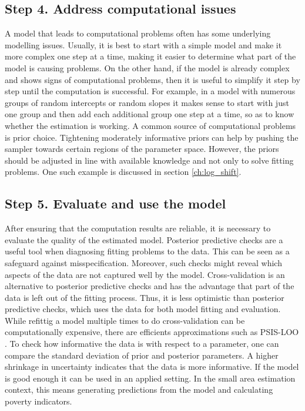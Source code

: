 
\subsection{Step 4. Address computational issues}

A model that leads to computational problems often has some underlying modelling issues.
Usually, it is best to start with a simple model and make it more complex one step at a time, making it easier to determine what part of the model is causing problems.
On the other hand, if the model is already complex and shows signs of computational problems, then it is useful to simplify it step by step until the computation is successful.
For example, in a model with numerous groups of random intercepts or random slopes it makes sense to start with just one group and then add each additional group one step at a time, so as to know whether the estimation is working.
A common source of computational problems is prior choice.
Tightening moderately informative priors can help by pushing the sampler towards certain regions of the parameter space.
However, the priors should be adjusted in line with available knowledge and not only to solve fitting problems.
One such example is discussed in section \ref{ch:log_shift}.

\subsection{Step 5. Evaluate and use the model}

After ensuring that the computation results are reliable, it is necessary to evaluate the quality of the estimated model.
Posterior predictive checks are a useful tool when diagnosing fitting problems to the data.
This can be seen as a safeguard against misspecification.
Moreover, such checks might reveal which aspects of the data are not captured well by the model.
Cross-validation is an alternative to posterior predictive checks and has the advantage that part of the data is left out of the fitting process.
Thus, it is less optimistic than posterior predictive checks, which uses the data for both model fitting and evaluation.
While refittig a model multiple times to do cross-validation can be computationally expensive, there are efficients approximations such as PSIS-LOO \citep{vehtari_practical_2017}.
To check how informative the data is with respect to a parameter, one can compare the standard deviation of prior and posterior parameters. A higher shrinkage in uncertainty indicates that the data is more informative.
If the model is good enough it can be used in an applied setting.
In the small area estimation context, this means generating predictions from the model and calculating poverty indicators.

